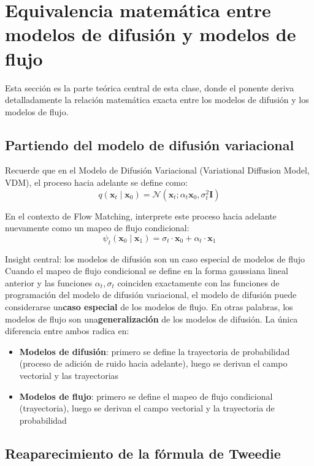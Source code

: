 \section{Equivalencia matemática entre modelos de difusión y modelos de flujo}

Esta sección es la parte teórica central de esta clase, donde el ponente deriva detalladamente la relación matemática exacta entre los modelos de difusión y los modelos de flujo.

\subsection{Partiendo del modelo de difusión variacional}

Recuerde que en el Modelo de Difusión Variacional (Variational Diffusion Model, VDM), el proceso hacia adelante se define como:
$$q(\mathbf{x}_t \mid \mathbf{x}_0) = \mathcal{N}(\mathbf{x}_t; \alpha_t \mathbf{x}_0, \sigma_t^2 \mathbf{I})$$

En el contexto de Flow Matching, interprete este proceso hacia adelante nuevamente como un mapeo de flujo condicional:
$$\psi_t(\mathbf{x}_0 \mid \mathbf{x}_1) = \sigma_t \cdot \mathbf{x}_0 + \alpha_t \cdot \mathbf{x}_1$$

\begin{importantbox}{Insight central: los modelos de difusión son un caso especial de modelos de flujo}
Cuando el mapeo de flujo condicional se define en la forma gaussiana lineal anterior y las funciones $\alpha_t, \sigma_t$ coinciden exactamente con las funciones de programación del modelo de difusión variacional, el modelo de difusión puede considerarse un\textbf{caso especial} de los modelos de flujo. En otras palabras, los modelos de flujo son una\textbf{generalización} de los modelos de difusión. La única diferencia entre ambos radica en:
\begin{itemize}
    \item \textbf{Modelos de difusión}: primero se define la trayectoria de probabilidad (proceso de adición de ruido hacia adelante), luego se derivan el campo vectorial y las trayectorias
    \item \textbf{Modelos de flujo}: primero se define el mapeo de flujo condicional (trayectoria), luego se derivan el campo vectorial y la trayectoria de probabilidad
\end{itemize}
\end{importantbox}

\subsection{Reaparecimiento de la fórmula de Tweedie}


